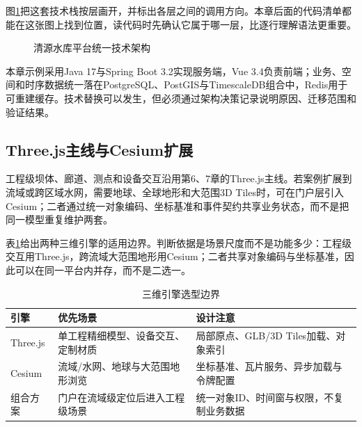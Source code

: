 图\ref{fig:case-layered-architecture}把这套技术栈按层画开，并标出各层之间的调用方向。本章后面的代码清单都能在这张图上找到位置，读代码时先确认它属于哪一层，比逐行理解语法更重要。

\begin{figure}[H]
\centering
{}
\caption{清源水库平台统一技术架构}
\label{fig:case-layered-architecture}
\end{figure}

本章示例采用Java 17与Spring Boot 3.2实现服务端，Vue 3.4负责前端；业务、空间和时序数据统一落在PostgreSQL、PostGIS与TimescaleDB组合中，Redis用于可重建缓存。技术替换可以发生，但必须通过架构决策记录说明原因、迁移范围和验证结果。

\subsection{Three.js主线与Cesium扩展}

工程级坝体、廊道、测点和设备交互沿用第6、7章的Three.js主线。若案例扩展到流域或跨区域水网，需要地球、全球地形和大范围3D Tiles时，可在门户层引入Cesium；二者通过统一对象编码、坐标基准和事件契约共享业务状态，而不是把同一模型重复维护两套。

表\ref{tab:three-cesium-selection}给出两种三维引擎的适用边界。判断依据是场景尺度而不是功能多少：工程级交互用Three.js，跨流域大范围地形用Cesium；二者共享对象编码与坐标基准，因此可以在同一平台内并存，而不是二选一。

\begin{table}[htbp]
\centering
\caption{三维引擎选型边界}
\label{tab:three-cesium-selection}
\begin{tabular}{p{2.4cm}p{4.6cm}p{5.3cm}}
\toprule
引擎 & 优先场景 & 设计注意 \\
\midrule
Three.js & 单工程精细模型、设备交互、定制材质 & 局部原点、GLB/3D Tiles加载、对象索引 \\
Cesium & 流域/水网、地球与大范围地形浏览 & 坐标基准、瓦片服务、异步加载与令牌配置 \\
组合方案 & 门户在流域级定位后进入工程级场景 & 统一对象ID、时间窗与权限，不复制业务数据 \\
\bottomrule
\end{tabular}
\end{table}

